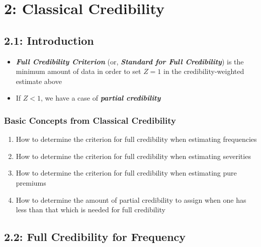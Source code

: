 \documentclass[
]{article}
\begin{document}
\hypertarget{classical-credibility}{%
\section{2: Classical Credibility}\label{classical-credibility}}

\hypertarget{introduction-1}{%
\subsection{2.1: Introduction}\label{introduction-1}}

\begin{blue}

\begin{itemize}
\item
  \textbf{\emph{Full Credibility Criterion}} (or, \textbf{\emph{Standard
  for Full Credibility}}) is the minimum amount of data in order to set
  \(Z=1\) in the credibility-weighted estimate above
\item
  If \(Z<1\), we have a case of \textbf{\emph{partial credibility}}
\end{itemize}

\end{blue}

\begin{green}

\hypertarget{basic-concepts-from-classical-credibility}{%
\subsubsection{Basic Concepts from Classical
Credibility}\label{basic-concepts-from-classical-credibility}}

\begin{enumerate}
\def\labelenumi{\arabic{enumi}.}
\item
  How to determine the criterion for full credibility when estimating
  frequencies
\item
  How to determine the criterion for full credibility when estimating
  severities
\item
  How to determine the criterion for full credibility when estimating
  pure premiums
\item
  How to determine the amount of partial credibility to assign when one
  has less than that which is needed for full credibility
\end{enumerate}

\end{green}

\hypertarget{full-credibility-for-frequency}{%
\subsection{2.2: Full Credibility for
Frequency}\label{full-credibility-for-frequency}}
\end{document}
